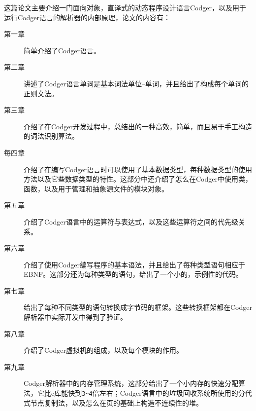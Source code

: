 \newline
这篇论文主要介绍一门面向对象，直译式的动态程序设计语言Codger，以及用于运行Codger语言的解析器的内部原理，论文的内容有：
\begin{description}
\item[第一章]简单介绍了Codger语言。
\item[第二章]讲述了Codger语言单词是基本词法单位--单词，并且给出了构成每个单词的正则文法。
\item[第三章]介绍了在Codger开发过程中，总结出的一种高效，简单，而且易于手工构造的词法识别算法。
\item[每四章]介绍了在编写Codger语言时可以使用了基本数据类型，每种数据类型的使用方法以及它些数据类型的特性。这部分中还介绍了怎么在Codger中使用类，函数，以及用于管理和抽象源文件的模块对象。
\item[第五章]介绍了Codger语言中的运算符与表达式，以及这些运算符之间的代先级关系。
\item[第六章]介绍了使用Codger编写程序的基本语法，并且给出了每种类型语句相应于EBNF。这部分还为每种类型的语句，给出了一个小的，示例性的代码。
\item[第七章]给出了每种不同类型的语句转换成字节码的框架。这些转换框架都在Codger解析器中实际开发中得到了验证。
\item[第八章]介绍了Codger虚拟机的组成，以及每个模块的作用。
\item[第九章]Codger解析器中的内存管理系统，这部分给出了一个小内存的快速分配算法，它比c库能快到\verb|3~4|倍左右；Codger语言中的垃圾回收系统所使用的分代式节点复制法，以及怎么在页的基础上构造不连续性的堆。
\end{description}

